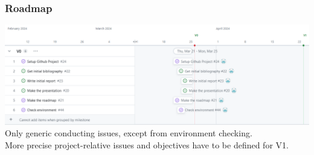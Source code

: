 \documentclass[10pt]{beamer}
\begin{document}
\begin{frame}
    \frametitle{\textbf{Roadmap}}
    \includegraphics[width=\textwidth]{../../roadmap/roadmapv0-group.png}\\
    [1cm]
    Only generic conducting issues, except from environment checking.\\
    More precise project-relative issues and objectives have to be defined for V1.
\end{frame}
\end{document}
